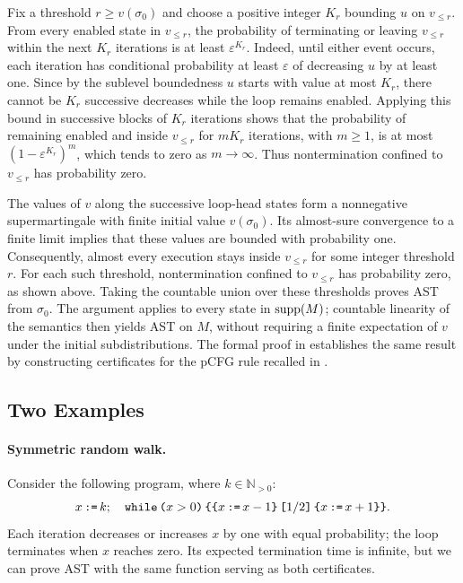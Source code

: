 Fix a threshold $r\geq v(\sigma_0)$ and choose a positive integer
$K_r$ bounding $u$ on $v_{\leq r}$.
From every enabled state in $v_{\leq r}$, the probability of terminating
or leaving $v_{\leq r}$ within the next $K_r$ iterations is at least
$\varepsilon^{K_r}$.
Indeed, until either event occurs, each iteration has conditional
probability at least $\varepsilon$ of decreasing $u$ by at least one.
Since by the sublevel boundedness $u$ starts with value at most $K_r$, there cannot be $K_r$ successive
decreases while the loop remains enabled.
Applying this bound in successive blocks of $K_r$ iterations shows
that the probability of remaining enabled and inside $v_{\leq r}$
for $mK_r$ iterations, with $m\geq1$, is at most
$(1-\varepsilon^{K_r})^m$, which tends to zero as $m\to\infty$.
Thus nontermination confined to $v_{\leq r}$ has probability zero.

The values of $v$ along the successive loop-head states form a
nonnegative supermartingale with finite initial value $v(\sigma_0)$.
Its almost-sure convergence to a finite limit implies that these values
are bounded with probability one. Consequently, almost every execution
stays inside $v_{\leq r}$ for some integer threshold $r$.
For each such threshold, nontermination confined to $v_{\leq r}$ has
probability zero, as shown above. Taking the countable union over these
thresholds proves AST from $\sigma_0$.
The argument applies to every state in $\textnormal{supp}(M)$; countable linearity
of the semantics then yields AST on $M$, without requiring a finite
expectation of $v$ under the initial subdistributions.
The formal proof in  establishes the same result
by constructing certificates for the pCFG rule recalled in
.

\subsection{Two Examples}
\label{sec:rule-examples}

\paragraph{Symmetric random walk.}
Consider the following program, where $k\in\mathbb N_{>0}$:
\[
 x\,\textnormal{\texttt{:=}}\, k;\quad
 \textnormal{\texttt{while}}\,\textnormal{\texttt{(}} x>0\textnormal{\texttt{)}}\,\textnormal{\texttt{\{}}\textnormal{\texttt{\{}}x\,\textnormal{\texttt{:=}}\, x-1\textnormal{\texttt{\}}} \, \textnormal{\texttt{[}}1/2\textnormal{\texttt{]}} \, \textnormal{\texttt{\{}}x\,\textnormal{\texttt{:=}}\, x+1\textnormal{\texttt{\}}}\textnormal{\texttt{\}}}.
\]
Each iteration decreases or increases $x$ by one with equal probability;
the loop terminates when $x$ reaches zero.
Its expected termination time is infinite, but we can prove AST with
the same function serving as both certificates.

